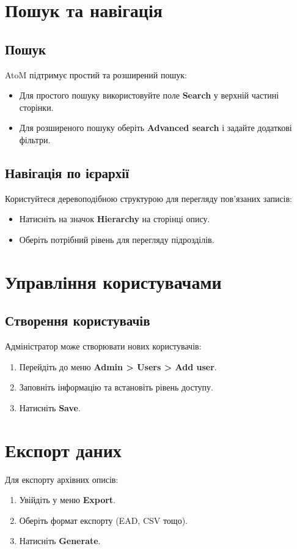\documentclass[14pt,a4paper]{article}
\begin{document}
\section{Пошук та навігація}
\subsection{Пошук}
AtoM підтримує простий та розширений пошук:
\begin{itemize}
	\item Для простого пошуку використовуйте поле \textbf{Search} у верхній частині сторінки.
	\item Для розширеного пошуку оберіть \textbf{Advanced search} і задайте додаткові фільтри.
\end{itemize}

\subsection{Навігація по ієрархії}
Користуйтеся деревоподібною структурою для перегляду пов'язаних записів:
\begin{itemize}
	\item Натисніть на значок \textbf{Hierarchy} на сторінці опису.
	\item Оберіть потрібний рівень для перегляду підрозділів.
\end{itemize}

\section{Управління користувачами}
\subsection{Створення користувачів}
Адміністратор може створювати нових користувачів:
\begin{enumerate}
	\item Перейдіть до меню \textbf{Admin > Users > Add user}.
	\item Заповніть інформацію та встановіть рівень доступу.
	\item Натисніть \textbf{Save}.
\end{enumerate}

\section{Експорт даних}
Для експорту архівних описів:
\begin{enumerate}
	\item Увійдіть у меню \textbf{Export}.
	\item Оберіть формат експорту (EAD, CSV тощо).
	\item Натисніть \textbf{Generate}.
\end{enumerate}
\end{document}
